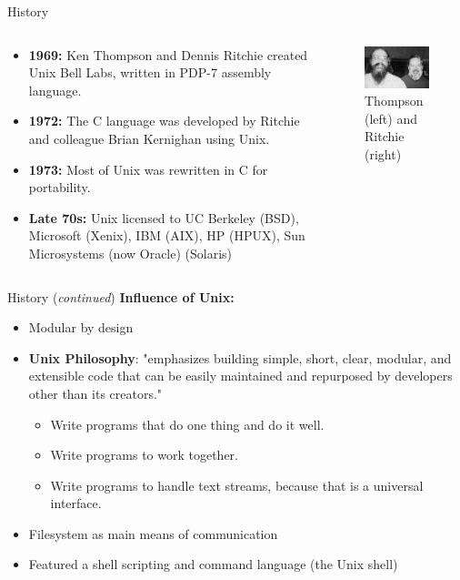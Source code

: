 \documentclass[11pt]{beamer}
\begin{document}
\begin{frame}{History}
	\begin{columns}
		\begin{column}{0.5\textwidth}
			\begin{itemize}
				\item \textbf{1969:} Ken Thompson and Dennis Ritchie created Unix Bell Labs, written in PDP-7 assembly language.
				\item \textbf{1972:} The C language was developed by Ritchie and colleague Brian Kernighan using Unix.
				\item \textbf{1973:} Most of Unix was rewritten in C for portability.
				\item \textbf{Late 70s:} Unix licensed to UC Berkeley (BSD), Microsoft (Xenix), IBM (AIX), HP (HPUX), Sun Microsystems (now Oracle) (Solaris)
			\end{itemize}
		\end{column}
		\begin{column}{0.5\textwidth}
			\begin{figure}
				\includegraphics[scale=0.5]{thompson-and-ritchie.png}
				\caption{Thompson (left) and Ritchie (right)}
			\end{figure}
		\end{column}
	\end{columns}
\end{frame}

\begin{frame}{History (\textit{continued})}
	\textbf{\LARGE Influence of Unix:}
	\begin{itemize}
		\item Modular by design
		\item \textbf{Unix Philosophy}: "emphasizes building simple, short, clear, modular, and extensible code that can be easily maintained and repurposed by developers other than its creators."
		\begin{itemize}
			\item Write programs that do one thing and do it well.
			\item Write programs to work together.
			\item Write programs to handle text streams, because that is a universal interface.
		\end{itemize}
		\item Filesystem as main means of communication
		\item Featured a shell scripting and command language (the Unix shell)
	\end{itemize}
\end{frame}
\end{document}
